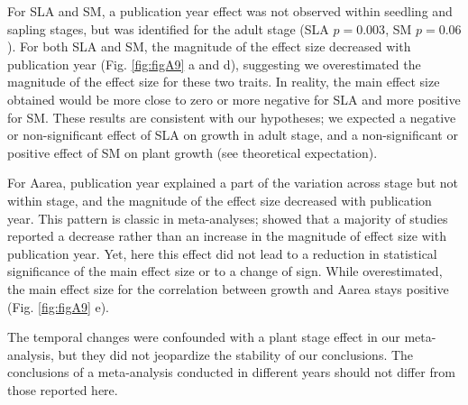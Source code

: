 \documentclass[a4paper,11pt]{article}
\begin{document}
\begin{appendices}
For SLA and SM, a publication year effect was not observed within seedling and sapling stages, but was identified for the adult stage (SLA $p = 0.003$, SM $p = 0.06$). For both SLA and SM, the magnitude of the effect size decreased with publication year (Fig. \ref{fig:figA9} a and d), suggesting we overestimated the magnitude of the effect size for these two traits. In reality, the main effect size obtained would be more close to zero or more negative for SLA and more positive for SM. These results are consistent with our hypotheses; we expected a negative or non-significant effect of SLA on growth in adult stage, and a non-significant or positive effect of SM on plant growth (see theoretical expectation).

For Aarea, publication year explained a part of the variation across stage but not within stage, and the magnitude of the effect size decreased with publication year. This pattern is classic in meta-analyses; \citealt{Koricheva:2013hy} showed that a majority of studies reported a decrease rather than an increase in the magnitude of effect size with publication year. Yet, here this effect did not lead to a reduction in statistical significance of the main effect size or to a change of sign. While overestimated, the main effect size for the correlation between growth and Aarea stays positive (Fig. \ref{fig:figA9} e).  

The temporal changes were confounded with a plant stage effect in our meta-analysis, but they did not jeopardize the stability of our conclusions. The conclusions of a meta-analysis conducted in different years should not differ from those reported here.


\end{appendices}
\end{document}
